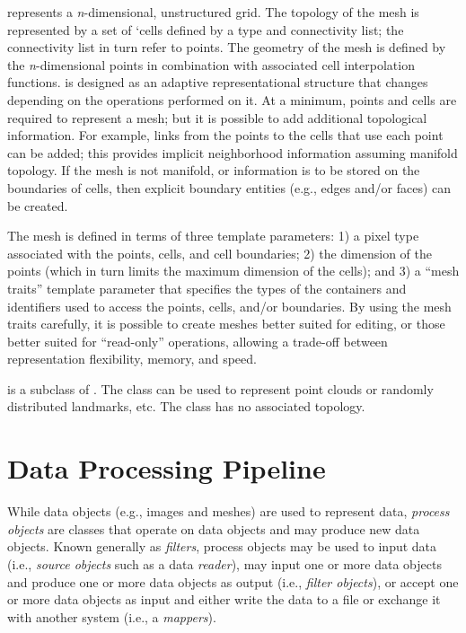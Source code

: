 
 represents a \emph{n}-dimensional, unstructured grid. The
topology of the mesh is represented by a set of `cells defined by a type and
connectivity list; the connectivity list in turn refer to points.  The
geometry of the mesh is defined by the \emph{n}-dimensional points in
combination with associated cell interpolation functions.  is
designed as an adaptive representational structure that changes depending on
the operations performed on it. At a minimum, points and cells are required
to represent a mesh; but it is possible to add additional topological
information.  For example, links from the points to the cells that use each
point can be added; this provides implicit neighborhood information assuming
manifold topology. If the mesh is not manifold, or information is to be
stored on the boundaries of cells, then explicit boundary entities (e.g.,
edges and/or faces) can be created.

The mesh is defined in terms of three template parameters: 1) a pixel type
associated with the points, cells, and cell boundaries; 2) the dimension of
the points (which in turn limits the maximum dimension of the cells); and 3)
a ``mesh traits'' template parameter that specifies the types of the
containers and identifiers used to access the points, cells, and/or
boundaries. By using the mesh traits carefully, it is possible to create
meshes better suited for editing, or those better suited for ``read-only''
operations, allowing a trade-off between representation flexibility, memory,
and speed.

 is a subclass of . The 
class can be used to represent point clouds or randomly distributed
landmarks, etc. The  class has no associated topology.


\section{Data Processing Pipeline}
\label{sec:DataProcessingPipeline}



While data objects (e.g., images and meshes) are used to represent data,
\emph{process objects} are classes that operate on data objects and may
produce new data objects. Known generally as \emph{filters}, process objects
may be used to input data (i.e., \emph{source objects} such as a data
\emph{reader}), may input one or more data objects and produce one or more
data objects as output (i.e., \emph{filter objects}), or accept one or more
data objects as input and either write the data to a file or exchange it with
another system (i.e., a \emph{mappers}).

